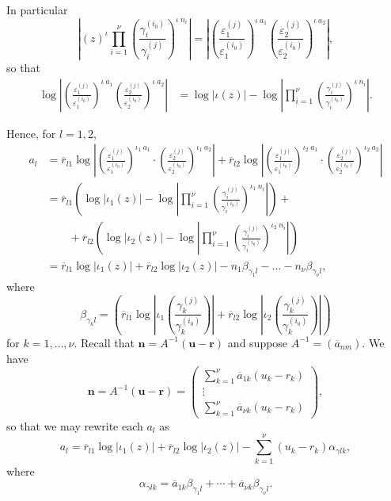 \documentclass[11pt]{report}
\theoremstyle{definition}
\begin{document}
In particular
\[\left|(z)^{\iota} \prod_{i = 1}^{\nu} \left( \frac{\gamma_i^{(i_0)}}{\gamma_i^{(j)}}\right)^{\iota \ n_i}\right| = \left|\left( \frac{\varepsilon_1^{(j)}}{\varepsilon_1^{(i_0)}}\right)^{\iota \ a_1}\left( \frac{\varepsilon_2^{(j)}}{\varepsilon_2^{(i_0)}}\right)^{\iota \ a_2}\right|,\]
so that
\begin{align*}
\log\left|\left( \frac{\varepsilon_1^{(j)}}{\varepsilon_1^{(i_0)}}\right)^{\iota \ a_1}\left( \frac{\varepsilon_2^{(j)}}{\varepsilon_2^{(i_0)}}\right)^{\iota \ a_2}\right|
	& = \log|\iota(z)| - \log\left| \prod_{i = 1}^{\nu} \left( \frac{\gamma_i^{(j)}}{\gamma_i^{(i_0)}}\right)^{\iota \ n_i}\right|.
\end{align*}

Hence, for $l =1,2$,
\begin{align*}
a_l	& = \overline{r}_{l1}\log\left|\left(\frac{\varepsilon_1^{(j)}}{\varepsilon_1^{(i_0)}}\right)^{\iota_1 \ a_1} 		\cdot \left(\frac{\varepsilon_2^{(j)}}{\varepsilon_2^{(i_0)}}\right)^{\iota_1 \ a_2}\right| +
	\overline{r}_{l2}\log\left|\left(\frac{\varepsilon_1^{(j)}}{\varepsilon_1^{(i_0)}}\right)^{\iota_2\ a_1}
	\cdot \left(\frac{\varepsilon_2^{(j)}}{\varepsilon_2^{(i_0)}}\right)^{\iota_2 \ a_2}\right|\\
	& = \overline{r}_{l1}\left( \log|\iota_1(z)| - \log\left| \prod_{i = 1}^{\nu} \left( \frac{\gamma_i^{(j)}}{\gamma_i^{(i_0)}}\right)^{\iota_1 \ n_i}\right|\right) + \\
	& \quad \quad + \overline{r}_{l2}\left( \log|\iota_2(z)| - \log\left| \prod_{i = 1}^{\nu} \left( \frac{\gamma_i^{(j)}}{\gamma_i^{(i_0)}}\right)^{\iota_2 \ n_i}\right|\right)\\
	& = \overline{r}_{l1}\log|\iota_1(z)| + \overline{r}_{l2}\log|\iota_2(z)| - n_1\beta_{\gamma_1 l} - \dots - n_{\nu}\beta_{\gamma_{\nu} l},
\end{align*}
where
\[\beta_{\gamma_k l} = \left(\overline{r}_{l1} \log\left| \iota_1\left( \frac{\gamma_k^{(j)}}{\gamma_k^{(i_0)}}\right)\right|+ \overline{r}_{l2}\log\left| \iota_2\left( \frac{\gamma_k^{(j)}}{\gamma_k^{(i_0)}}\right)\right|\right)\]
for $k = 1, \dots, \nu$. Recall that $\mathbf{n} = A^{-1}(\mathbf{u} - \mathbf{r})$ and suppose $A^{-1} = (\overline{a}_{nm})$. We have
\[\mathbf{n}  = A^{-1}(\mathbf{u} - \mathbf{r})
	 = \begin{pmatrix} \sum_{k=1}^{\nu} \overline{a}_{1k}(u_k-r_k)\\  \vdots \\ \sum_{k=1}^{\nu} \overline{a}_{\nu k}(u_k-r_k) \end{pmatrix},\]
so that we may rewrite each $a_l$ as
\[a_l = \overline{r}_{l1}\log|\iota_1(z)| + \overline{r}_{l2}\log|\iota_2(z)| - \sum_{k=1}^{\nu}(u_k-r_k)\alpha_{\gamma l k},\]
where
\[\alpha_{\gamma l k} = \overline{a}_{1k}\beta_{\gamma_1 l} + \cdots + \overline{a}_{\nu k}\beta_{\gamma_{\nu} l}.\]
\end{document}
